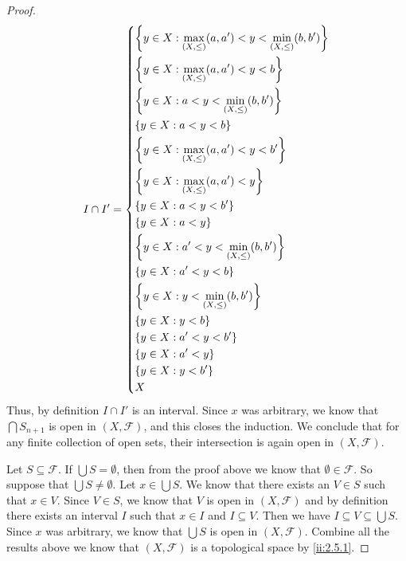 \begin{proof}
  \[
    I \cap I' = \begin{dcases}
      \left\lbrace y \in X : \max_{(X, \leq)}(a, a') < y < \min_{(X, \leq)}(b, b')\right\rbrace \\
      \left\lbrace y \in X : \max_{(X, \leq)}(a, a') < y < b\right\rbrace                       \\
      \left\lbrace y \in X : a < y < \min_{(X, \leq)}(b, b')\right\rbrace                       \\
      \left\lbrace y \in X : a < y < b\right\rbrace                                             \\
      \left\lbrace y \in X : \max_{(X, \leq)}(a, a') < y < b'\right\rbrace                      \\
      \left\lbrace y \in X : \max_{(X, \leq)}(a, a') < y\right\rbrace                           \\
      \left\lbrace y \in X : a < y < b'\right\rbrace                                            \\
      \left\lbrace y \in X : a < y\right\rbrace                                                 \\
      \left\lbrace y \in X : a' < y < \min_{(X, \leq)}(b, b')\right\rbrace                      \\
      \left\lbrace y \in X : a' < y < b\right\rbrace                                            \\
      \left\lbrace y \in X : y < \min_{(X, \leq)}(b, b')\right\rbrace                           \\
      \left\lbrace y \in X : y < b\right\rbrace                                                 \\
      \left\lbrace y \in X : a' < y < b'\right\rbrace                                           \\
      \left\lbrace y \in X : a' < y\right\rbrace                                                \\
      \left\lbrace y \in X : y < b'\right\rbrace                                                \\
      X
    \end{dcases}
  \]
  Thus, by definition \(I \cap I'\) is an interval.
  Since \(x\) was arbitrary, we know that \(\bigcap S_{n + 1}\) is open in \((X, \mathcal{F})\), and this closes the induction.
  We conclude that for any finite collection of open sets, their intersection is again open in \((X, \mathcal{F})\).

  Let \(S \subseteq \mathcal{F}\).
  If \(\bigcup S = \emptyset\), then from the proof above we know that \(\emptyset \in \mathcal{F}\).
  So suppose that \(\bigcup S \neq \emptyset\).
  Let \(x \in \bigcup S\).
  We know that there exists an \(V \in S\) such that \(x \in V\).
  Since \(V \in S\), we know that \(V\) is open in \((X, \mathcal{F})\) and by definition there exists an interval \(I\) such that \(x \in I\) and \(I \subseteq V\).
  Then we have \(I \subseteq V \subseteq \bigcup S\).
  Since \(x\) was arbitrary, we know that \(\bigcup S\) is open in \((X, \mathcal{F})\).
  Combine all the results above we know that \((X, \mathcal{F})\) is a topological space by \cref{ii:2.5.1}.


\end{proof}
